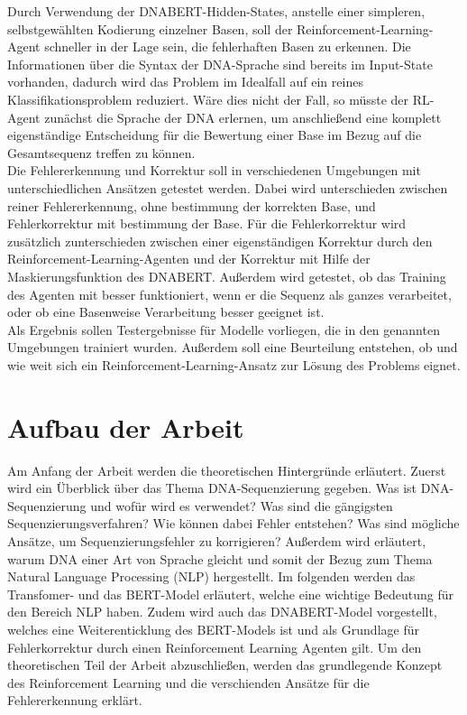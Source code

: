 \documentclass[oneside,bibliography=totocnumbered,BCOR=5mm]{scrbook}%
\theoremstyle{definition}
\theoremstyle{definition}
\theoremstyle{definition}
\theoremstyle{definition}
\theoremstyle{definition}
\theoremstyle{definition}
\begin{document}
Durch Verwendung der DNABERT-Hidden-States, anstelle einer simpleren, selbstgewählten Kodierung einzelner Basen, 
soll der Reinforcement-Learning-Agent schneller in der Lage sein, die fehlerhaften Basen zu erkennen. 
Die Informationen über die Syntax der DNA-Sprache sind bereits im Input-State vorhanden, 
dadurch wird das Problem im Idealfall auf ein reines Klassifikationsproblem reduziert. 
Wäre dies nicht der Fall, so müsste der RL-Agent zunächst die Sprache der DNA erlernen, 
um anschließend eine komplett eigenständige Entscheidung für die Bewertung einer Base 
im Bezug auf die Gesamtsequenz treffen zu können.\\


Die Fehlererkennung und Korrektur soll in verschiedenen Umgebungen mit unterschiedlichen Ansätzen
getestet werden. Dabei wird unterschieden zwischen reiner Fehlererkennung, ohne bestimmung der
korrekten Base, und Fehlerkorrektur mit bestimmung der Base. Für die Fehlerkorrektur wird zusätzlich
zunterschieden zwischen einer eigenständigen Korrektur durch den Reinforcement-Learning-Agenten und 
der Korrektur mit Hilfe der Maskierungsfunktion des DNABERT.
Außerdem wird getestet, ob das Training des Agenten mit besser funktioniert, wenn er die Sequenz als ganzes verarbeitet,
oder ob eine Basenweise Verarbeitung besser geeignet ist.\\


Als Ergebnis sollen Testergebnisse für Modelle vorliegen, die in den genannten Umgebungen trainiert wurden.
Außerdem soll eine Beurteilung entstehen, ob und wie weit sich ein Reinforcement-Learning-Ansatz 
zur Lösung des Problems eignet.



\section{Aufbau der Arbeit}


Am Anfang der Arbeit werden die theoretischen Hintergründe erläutert. 
Zuerst wird ein Überblick über das Thema DNA-Sequenzierung gegeben.
Was ist DNA-Sequenzierung und wofür wird es verwendet?
Was sind die gängigsten Sequenzierungsverfahren?
Wie können dabei Fehler entstehen?
Was sind mögliche Ansätze, um Sequenzierungsfehler zu korrigieren?
Außerdem wird erläutert, warum DNA einer Art von Sprache gleicht und 
somit der Bezug zum Thema Natural Language Processing (NLP) hergestellt.
Im folgenden werden das Transfomer- und das BERT-Model erläutert, welche eine wichtige Bedeutung 
für den Bereich NLP haben.
Zudem wird auch das DNABERT-Model vorgestellt, welches eine Weiterenticklung des BERT-Models ist 
und als Grundlage für Fehlerkorrektur durch einen Reinforcement Learning Agenten gilt.
Um den theoretischen Teil der Arbeit abzuschließen, werden das grundlegende Konzept des 
Reinforcement Learning und die verschienden Ansätze für die Fehlererkennung erklärt.\\
\end{document}
